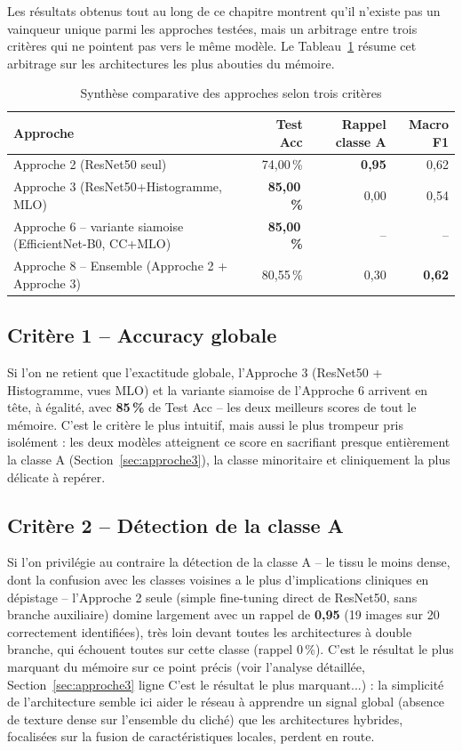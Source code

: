 \documentclass[12pt,a4paper]{report}
\begin{document}
Les résultats obtenus tout au long de ce chapitre montrent qu'il n'existe pas
un vainqueur unique parmi les approches testées, mais un arbitrage entre
trois critères qui ne pointent pas vers le même modèle. Le
Tableau~\ref{tab:synthese_comparative} résume cet arbitrage sur les
architectures les plus abouties du mémoire.

\begin{table}[h]
\centering
\caption{Synthèse comparative des approches selon trois critères}
\label{tab:synthese_comparative}
\begin{tabular}{lrrr}
\toprule
Approche & Test Acc & Rappel classe A & Macro F1 \\
\midrule
Approche 2 (ResNet50 seul) & 74{,}00\,\% & \textbf{0{,}95} & 0{,}62 \\
Approche 3 (ResNet50+Histogramme, MLO) & \textbf{85{,}00\,\%} & 0{,}00 & 0{,}54 \\
Approche 6 -- variante siamoise (EfficientNet-B0, CC+MLO) & \textbf{85{,}00\,\%} & -- & -- \\
Approche 8 -- Ensemble (Approche 2 + Approche 3) & 80{,}55\,\% & 0{,}30 & \textbf{0{,}62} \\
\bottomrule
\end{tabular}
\end{table}

\subsection{Critère 1 -- Accuracy globale}
Si l'on ne retient que l'exactitude globale, l'Approche 3 (ResNet50 +
Histogramme, vues MLO) et la variante siamoise de l'Approche 6 arrivent
en tête, à égalité, avec \textbf{85\,\%} de Test Acc -- les deux meilleurs
scores de tout le mémoire. C'est le critère le plus intuitif, mais aussi le
plus trompeur pris isolément : les deux modèles atteignent ce score en
sacrifiant presque entièrement la classe A (Section~\ref{sec:approche3}),
la classe minoritaire et cliniquement la plus délicate à repérer.

\subsection{Critère 2 -- Détection de la classe A}
Si l'on privilégie au contraire la détection de la classe A -- le tissu le
moins dense, dont la confusion avec les classes voisines a le plus
d'implications cliniques en dépistage -- l'Approche 2 seule (simple
fine-tuning direct de ResNet50, sans branche auxiliaire) domine largement
avec un rappel de \textbf{0{,}95} (19 images sur 20 correctement
identifiées), très loin devant toutes les architectures à double branche,
qui échouent toutes sur cette classe (rappel 0\,\%). C'est le résultat le
plus marquant du mémoire sur ce point précis (voir l'analyse détaillée,
Section~\ref{sec:approche3} ligne \og{}C'est le résultat le plus
marquant...\fg{}) : la simplicité de l'architecture semble ici aider le
réseau à apprendre un signal global (absence de texture dense sur
l'ensemble du cliché) que les architectures hybrides, focalisées sur la
fusion de caractéristiques locales, perdent en route.
\end{document}
